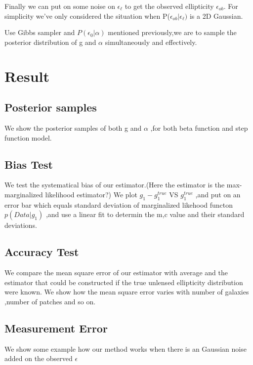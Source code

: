 \documentclass[useAMS,usenatbib]{mn2e}
\begin{document}
Finally we can put on some noise on $\epsilon_{\ell}$ to get the
observed ellipticity $\epsilon_{ob}$. For simplicity we've only considered
the situation when P($\epsilon_{ob}|\epsilon_{\ell})$ is a 2D Gaussian.

Use Gibbs sampler and $P(\epsilon_{0}|\alpha)$ mentioned previously,we
are to sample the posterior distribution of g and $\alpha$ simultaneously
and effectively.




\section{Result}
\label{sec:XXX}

\subsection{Posterior samples}
We show the posterior samples of both g and $\alpha$ ,for both beta function and step function model.
\subsection{Bias Test}
We test the systematical bias of our estimator.(Here the estimator is the max-marginalized likelihood estimator?)
We plot $g_{1}-g_{1}^{true}$ VS $g_{1}^{true}$ ,and put on an error bar which equals standard deviation of 
marginalized likehood functon $p(Data|g_{1})$ ,and use a linear fit to determin the m,c value and their standard 
deviations.

\subsection{Accuracy Test}
We compare the mean square error of our estimator with average and the estimator that could be constructed if the true unlensed
ellipticity distribution were known.
We show how the mean square error varies with number of galaxies ,number of patches and so on.

\subsection{Measurement Error}
We show some example how our method works when there is an Gaussian noise added on the observed $\epsilon$
\end{document}
